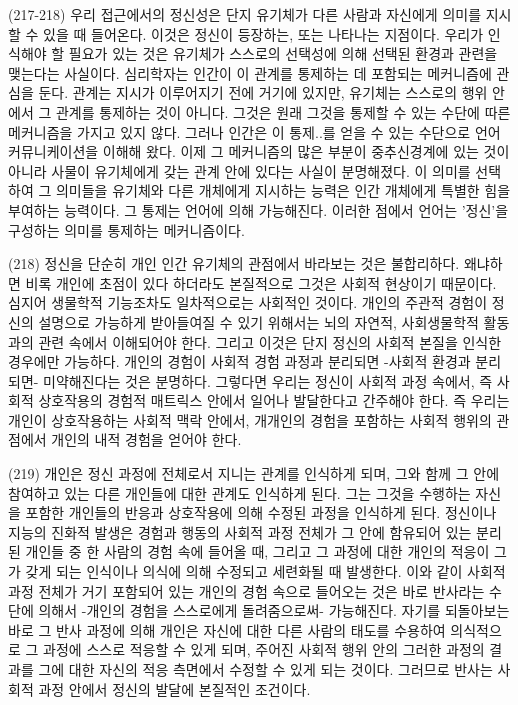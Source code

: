 \documentclass[12pt, a4paper]{article}
\begin{document}
(217-218) 우리 접근에서의 정신성은 단지 유기체가 다른 사람과 자신에게 의미를 지시할 수 있을 때 들어온다. 이것은 정신이 등장하는, 또는 나타나는 지점이다. 우리가 인식해야 할 필요가 있는 것은 유기체가 스스로의 선택성에 의해 선택된 환경과 관련을 맺는다는 사실이다. 심리학자는 인간이 이 관계를 통제하는 데 포함되는 메커니즘에 관심을 둔다. 관계는 지시가 이루어지기 전에 거기에 있지만, 유기체는 스스로의 행위 안에서 그 관계를 통제하는 것이 아니다. 그것은 원래 그것을 통제할 수 있는 수단에 따른 메커니즘을 가지고 있지 않다. 그러나 인간은 이 통제..를 얻을 수 있는 수단으로 언어 커뮤니케이션을 이해해 왔다. 이제 그 메커니즘의 많은 부분이 중추신경계에 있는 것이 아니라 사물이 유기체에게 갖는 관계 안에 있다는 사실이 분명해졌다. 이 의미를 선택하여 그 의미들을 유기체와 다른 개체에게 지시하는 능력은 인간 개체에게 특별한 힘을 부여하는 능력이다. 그 통제는 언어에 의해 가능해진다. 이러한 점에서 언어는 '정신'을 구성하는 의미를 통제하는 메커니즘이다.

(218) 정신을 단순히 개인 인간 유기체의 관점에서 바라보는 것은 불합리하다. 왜냐하면 비록 개인에 초점이 있다 하더라도 본질적으로 그것은 사회적 현상이기 때문이다. 심지어 생물학적 기능조차도 일차적으로는 사회적인 것이다. 개인의 주관적 경험이 정신의 설명으로 가능하게 받아들여질 수 있기 위해서는 뇌의 자연적, 사회생물학적 활동과의 관련 속에서 이해되어야 한다. 그리고 이것은 단지 정신의 사회적 본질을 인식한 경우에만 가능하다. 개인의 경험이 사회적 경험 과정과 분리되면 -사회적 환경과 분리되면- 미약해진다는 것은 분명하다. 그렇다면 우리는 정신이 사회적 과정 속에서, 즉 사회적 상호작용의 경험적 매트릭스 안에서 일어나 발달한다고 간주해야 한다. 즉 우리는 개인이 상호작용하는 사회적 맥락 안에서, 개개인의 경험을 포함하는 사회적 행위의 관점에서 개인의 내적 경험을 얻어야 한다. 

(219) 개인은 정신 과정에 전체로서 지니는 관계를 인식하게 되며, 그와 함께 그 안에 참여하고 있는 다른 개인들에 대한 관계도 인식하게 된다. 그는 그것을 수행하는 자신을 포함한 개인들의 반응과 상호작용에 의해 수정된 과정을 인식하게 된다. 정신이나 지능의 진화적 발생은 경험과 행동의 사회적 과정 전체가 그 안에 함유되어 있는 분리된 개인들 중 한 사람의 경험 속에 들어올 때, 그리고 그 과정에 대한 개인의 적응이 그가 갖게 되는 인식이나 의식에 의해 수정되고 세련화될 때 발생한다. 이와 같이 사회적 과정 전체가 거기 포함되어 있는 개인의 경험 속으로 들어오는 것은 바로 반사라는 수단에 의해서 -개인의 경험을 스스로에게 돌려줌으로써- 가능해진다. 자기를 되돌아보는 바로 그 반사 과정에 의해 개인은 자신에 대한 다른 사람의 태도를 수용하여 의식적으로 그 과정에 스스로 적응할 수 있게 되며, 주어진 사회적 행위 안의 그러한 과정의 결과를 그에 대한 자신의 적응 측면에서 수정할 수 있게 되는 것이다. 그러므로 반사는 사회적 과정 안에서 정신의 발달에 본질적인 조건이다.
\end{document}
